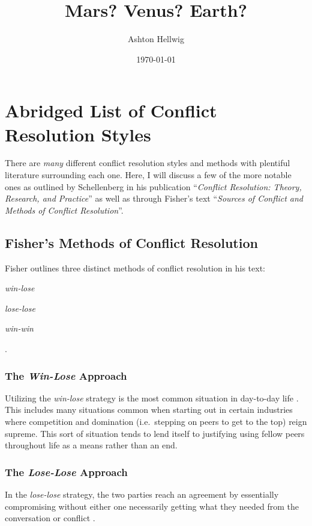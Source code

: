 \documentclass[stu,12pt]{apa7}
\title{%
    Mars? Venus? Earth?
  }
\author{Ashton Hellwig}
\date{\today}
\begin{document}
  \maketitle


  \section{Abridged List of Conflict Resolution Styles}
    There are \textit{many} different conflict resolution styles and methods
      with plentiful literature surrounding each one. Here, I will discuss
      a few of the more notable ones as outlined by Schellenberg in his
      publication ``\textit{Conflict Resolution: Theory, Research, and
      Practice}'' as well as through Fisher's text ``\textit{Sources of Conflict
      and Methods of Conflict Resolution}''.

    \subsection{Fisher's Methods of Conflict Resolution}
      Fisher outlines three distinct methods of conflict resolution in his
        text:
        \begin{seriate}
          \item \textit{win-lose}
          \item \textit{lose-lose}
          \item \textit{win-win}
        \end{seriate}
        \parencite[pp. 4--5]{fisher_sources_2000}.

      \subsubsection{The \textit{Win-Lose} Approach}
        Utilizing the \textit{win-lose} strategy is the most common situation
          in day-to-day life \parencite[pp. 4--5]{fisher_sources_2000}. This
          includes many situations common when starting out in certain
          industries where competition and domination (i.e.\ stepping on peers
          to get to the top) reign supreme. This sort of situation tends to lend
          itself to justifying using fellow peers throughout life as a means
          rather than an end.

      \subsubsection{The \textit{Lose-Lose} Approach}
        In the \textit{lose-lose} strategy, the two parties reach an agreement
          by essentially compromising without either one necessarily getting
          what they needed from the conversation or conflict
          \parencite[pp. 5]{fisher_sources_2000}.
\end{document}
